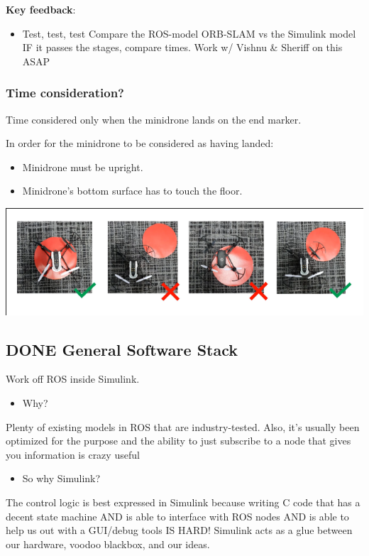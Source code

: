 \documentclass[unrestricted]{meetingnotesminutes}
\begin{document}
\textbf{Key feedback}:

\begin{itemize}
\item Test, test, test
Compare the ROS-model ORB-SLAM vs the Simulink model
IF it passes the stages, compare times.
Work w/ Vishnu \& Sheriff on this ASAP
\end{itemize}

\subsubsection{Time consideration?}
\label{sec:org70b5c40}
Time considered only when the minidrone lands on the end marker.

In order for the minidrone to be considered as having landed:
\begin{itemize}
\item Minidrone must be upright.
\item Minidrone's bottom surface has to touch the floor.
\end{itemize}
\begin{center}
\includegraphics[width=.9\linewidth]{./images/screenshot-01.png}
\end{center}

\subsection{{\bfseries\sffamily DONE} General Software Stack}
\label{sec:org19747a7}
Work off ROS inside Simulink.

\begin{itemize}
\item Why?
\end{itemize}
Plenty of existing models in ROS that are industry-tested. Also, it's usually been optimized for the purpose and the ability to just subscribe to a node that gives you information is crazy useful

\begin{itemize}
\item So why Simulink?
\end{itemize}
The control logic is best expressed in Simulink because writing C code that has a decent state machine AND is able to interface with ROS nodes AND is able to help us out with a GUI/debug tools IS HARD! Simulink acts as a glue between our hardware, voodoo blackbox, and our ideas.
\end{document}
